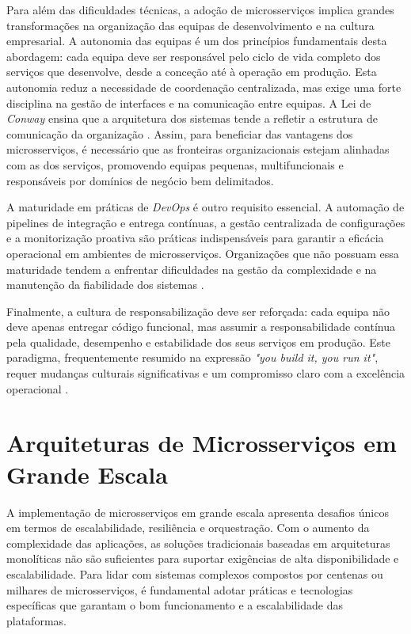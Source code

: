Para além das dificuldades técnicas, a adoção de microsserviços implica grandes transformações na organização das equipas de desenvolvimento e na cultura empresarial. A autonomia das equipas é um dos princípios fundamentais desta abordagem: cada equipa deve ser responsável pelo ciclo de vida completo dos serviços que desenvolve, desde a conceção até à operação em produção. Esta autonomia reduz a necessidade de coordenação centralizada, mas exige uma forte disciplina na gestão de interfaces e na comunicação entre equipas. A Lei de \textit{ Conway} ensina que a arquitetura dos sistemas tende a refletir a estrutura de comunicação da organização \cite{Bailey2013}. Assim, para beneficiar das vantagens dos microsserviços, é necessário que as fronteiras organizacionais estejam alinhadas com as dos serviços, promovendo equipas pequenas, multifuncionais e responsáveis por domínios de negócio bem delimitados.

A maturidade em práticas de \textit{ DevOps} é outro requisito essencial. A automação de pipelines de integração e entrega contínuas, a gestão centralizada de configurações e a monitorização proativa são práticas indispensáveis para garantir a eficácia operacional em ambientes de microsserviços. Organizações que não possuam essa maturidade tendem a enfrentar dificuldades na gestão da complexidade e na manutenção da fiabilidade dos sistemas \cite{Lewis2014}.

Finalmente, a cultura de responsabilização deve ser reforçada: cada equipa não deve apenas entregar código funcional, mas assumir a responsabilidade contínua pela qualidade, desempenho e estabilidade dos seus serviços em produção. Este paradigma, frequentemente resumido na expressão \textit{"you build it, you run it"}, requer mudanças culturais significativas e um compromisso claro com a excelência operacional \cite{Khan2022}.


\section{Arquiteturas de Microsserviços em Grande Escala}

A implementação de microsserviços em grande escala apresenta desafios únicos em termos de escalabilidade, resiliência e orquestração. Com o aumento da complexidade das aplicações, as soluções tradicionais baseadas em arquiteturas monolíticas não são suficientes para suportar exigências de alta disponibilidade e escalabilidade. Para lidar com sistemas complexos compostos por centenas ou milhares de microsserviços, é fundamental adotar práticas e tecnologias específicas que garantam o bom funcionamento e a escalabilidade das plataformas.

